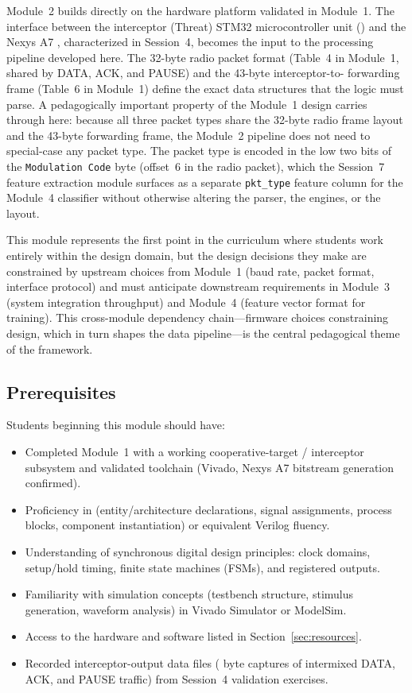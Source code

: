 \documentclass[11pt,letterpaper]{article}
\begin{document}
	Module~2 builds directly on the hardware platform validated in Module~1. The \UART{} interface between the interceptor (Threat) STM32 microcontroller unit (\MCU{}) and the Nexys A7 \FPGA{}, characterized in Session~4, becomes the input to the \RTL{} processing pipeline developed here. The 32-byte radio packet format (Table~4 in Module~1, shared by DATA, ACK, and PAUSE) and the 43-byte interceptor-to-\FPGA{} forwarding frame (Table~6 in Module~1) define the exact data structures that the \FPGA{} logic must parse. A pedagogically important property of the Module~1 design carries through here: because all three packet types share the 32-byte radio frame layout and the 43-byte forwarding frame, the Module~2 \RTL{} pipeline does not need to special-case any packet type. The packet type is encoded in the low two bits of the \texttt{Modulation Code} byte (offset~6 in the radio packet), which the Session~7 feature extraction module surfaces as a separate \texttt{pkt\_type} feature column for the Module~4 classifier without otherwise altering the parser, the \CRC{} engines, or the \BRAM{} layout.

	This module represents the first point in the curriculum where students work entirely within the \FPGA{} design domain, but the design decisions they make are constrained by upstream choices from Module~1 (baud rate, packet format, interface protocol) and must anticipate downstream requirements in Module~3 (system integration throughput) and Module~4 (feature vector format for \ML{} training). This cross-module dependency chain---firmware choices constraining \RTL{} design, which in turn shapes the \ML{} data pipeline---is the central pedagogical theme of the framework.

	\subsection{Prerequisites}

	Students beginning this module should have:
	\begin{itemize}[leftmargin=2em]
		\item Completed Module~1 with a working cooperative-target / interceptor subsystem and validated \FPGA{} toolchain (Vivado, Nexys A7 bitstream generation confirmed).
		\item Proficiency in \VHDL{} (entity/architecture declarations, signal assignments, process blocks, component instantiation) or equivalent Verilog fluency.
		\item Understanding of synchronous digital design principles: clock domains, setup/hold timing, finite state machines (FSMs), and registered outputs.
		\item Familiarity with simulation concepts (testbench structure, stimulus generation, waveform analysis) in Vivado Simulator or ModelSim.
		\item Access to the hardware and software listed in Section~\ref{sec:resources}.
		\item Recorded interceptor-output data files (\UART{} byte captures of intermixed DATA, ACK, and PAUSE traffic) from Session~4 validation exercises.
	\end{itemize}
\end{document}
